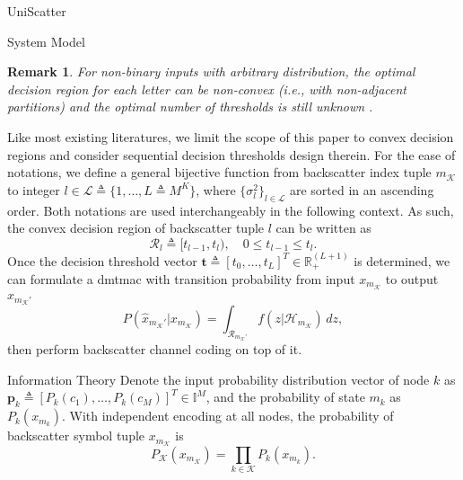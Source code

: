 \documentclass[journal]{IEEEtran}
\newtheorem{remark}{Remark}
\begin{document}
\begin{section}{UniScatter}
\begin{subsection}{System Model}
\begin{remark}
			For non-binary inputs with arbitrary distribution, the optimal decision region for each letter can be non-convex (i.e., with non-adjacent partitions) and the optimal number of thresholds is still unknown \cite{Nguyen2018,Nguyen2021}.
		\end{remark}
		Like most existing literatures, we limit the scope of this paper to convex decision regions and consider sequential decision thresholds design therein.
		For the ease of notations, we define a general bijective function from backscatter index tuple $m_{\mathcal{K}}$ to integer $l \in \mathcal{L} \triangleq \{1,\ldots,L \triangleq M^K\}$, where $\{\sigma_l^2\}_{l \in \mathcal{L}}$ are sorted in an ascending order.
		Both notations are used interchangeably in the following context.
		As such, the convex decision region of backscatter tuple $l$ can be written as
		\begin{equation}
			\mathcal{R}_{l} \triangleq [t_{l-1},t_l), \quad 0 \le t_{l-1} \le t_l.
		\end{equation}
		Once the decision threshold vector $\boldsymbol{t} \triangleq [t_0,\ldots,t_L]^T \in \mathbb{R}_+^{(L+1)}$ is determined, we can formulate a \gls{dmtmac} with transition probability from input $x_{m_{\mathcal{K}}}$ to output $\hat{x}_{m_{\mathcal{K}}'}$
		\begin{equation}
			P(\hat{x}_{m_{\mathcal{K}}'}|x_{m_{\mathcal{K}}}) = \int_{\mathcal{R}_{m_{\mathcal{K}}'}} f(z|\mathcal{H}_{m_{\mathcal{K}}}) \, d z,
			\label{eq:dmtmac}
		\end{equation}
		then perform backscatter channel coding on top of it.
	\end{subsection}

	\begin{subsection}{Information Theory}
		Denote the input probability distribution vector of node $k$ as $\boldsymbol{p}_k \triangleq [P_k(c_1),\ldots,P_k(c_M)]^T \in \mathbb{I}^{M}$, and the probability of state $m_k$ as $P_k(x_{m_k})$.
		With independent encoding at all nodes, the probability of backscatter symbol tuple $x_{m_{\mathcal{K}}}$ is
		\begin{equation}
			P_{\mathcal{K}}(x_{m_{\mathcal{K}}}) = \prod_{k \in \mathcal{K}} P_k(x_{m_k}).
			\label{eq:equivalent_distribution}
		\end{equation}


\end{subsection}
\end{section}
\end{document}
